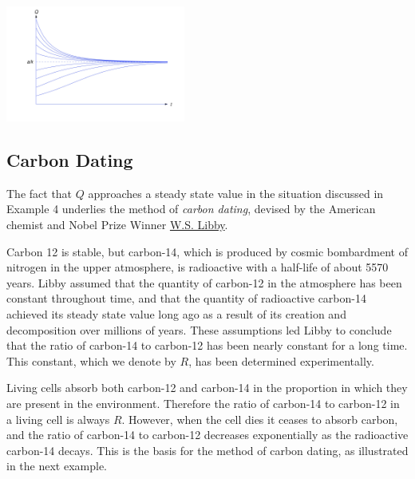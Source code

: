 \documentclass{ximera}
\begin{document}
\begin{example}
\begin{explanation}
\begin{image}
 \includegraphics[height=1.5in]{fig040103.jpg} 
 \end{image}

\end{explanation}
\end{example}



\subsection*{Carbon Dating}

The fact that $Q$ approaches a steady state value in the
situation discussed in Example 4 underlies the method of \textit{carbon dating}, devised by the American chemist and Nobel Prize Winner
\href{http://www.nobelprize.org/nobel_prizes/chemistry/laureates/1960/libby-lecture.pdf}{W.S. Libby}.

Carbon 12 is stable, but carbon-14, which is produced by cosmic
bombardment of nitrogen in the upper atmosphere, is radioactive with a
half-life of about 5570 years. Libby assumed that the
quantity
of carbon-12 in the atmosphere has been constant throughout time, and
that the quantity of radioactive carbon-14 achieved its steady state
value long ago as a result of its creation and decomposition over
millions of years. These assumptions led Libby to conclude that the
ratio of carbon-14 to carbon-12 has been nearly constant for a long
time. This constant, which we denote by $R$, has been determined
experimentally.

Living cells absorb both carbon-12 and carbon-14 in the proportion in
which they are present in the environment. Therefore the ratio of
carbon-14 to carbon-12 in a living cell is always $R$. However, when
the cell dies it ceases to absorb carbon, and the ratio of carbon-14
to carbon-12 decreases exponentially as the radioactive carbon-14
decays. This is the basis for the method of carbon dating, as
illustrated in the next example.
\end{document}
